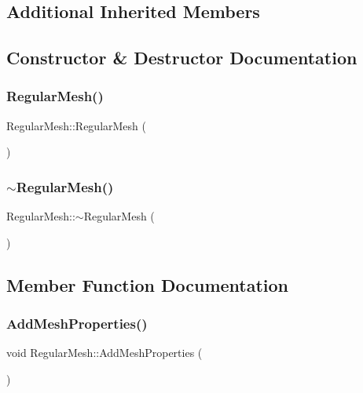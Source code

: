 \subsection*{Additional Inherited Members}


\subsection{Constructor \& Destructor Documentation}
\mbox{\label{class_regular_mesh_a96ec7f2ab73178638c6887b8a37735ac}} 
\subsubsection{\texorpdfstring{RegularMesh()}{RegularMesh()}}
{\footnotesize\ttfamily Regular\+Mesh\+::\+Regular\+Mesh (\begin{DoxyParamCaption}{ }\end{DoxyParamCaption})}

\mbox{\label{class_regular_mesh_aca610c9b242297893cdc2dc2f427b89e}} 
\subsubsection{\texorpdfstring{$\sim$RegularMesh()}{~RegularMesh()}}
{\footnotesize\ttfamily Regular\+Mesh\+::$\sim$\+Regular\+Mesh (\begin{DoxyParamCaption}{ }\end{DoxyParamCaption})}



\subsection{Member Function Documentation}
\mbox{\label{class_regular_mesh_a1f24f9c533797074ade33aee4e97cfb6}} 
\subsubsection{\texorpdfstring{AddMeshProperties()}{AddMeshProperties()}}
{\footnotesize\ttfamily void Regular\+Mesh\+::\+Add\+Mesh\+Properties (\begin{DoxyParamCaption}{ }\end{DoxyParamCaption})\hspace{0.3cm}{\ttfamily [virtual]}}



